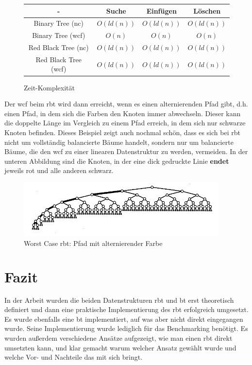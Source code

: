 \documentclass[11pt]{article}
\begin{document}
\begin{figure}[h]
  \centering  
  \caption{Zeit-Komplexität}
  \begin{tabular}{|c|c|c|c|} 
    \hline
    - & Suche & Einfügen & Löschen \\ 
    \hline
    Binary Tree (\gls{nc}) & $O(ld(n))$ & $O(ld(n))$ & $O(ld(n))$ \\ 
    \hline
    Binary Tree (\gls{wcf}) & $O(n)$ & $O(n)$ & $O(n)$ \\ 
    \hline
    Red Black Tree (\gls{nc}) & $O(ld(n))$ & $O(ld(n))$ & $O(ld(n))$ \\ 
    \hline
    Red Black Tree (\gls{wcf}) & $O(ld(n))$ & $O(ld(n))$ & $O(ld(n))$ \\ 
    \hline
  \end{tabular}
\end{figure}

Der \gls{wcf} beim \gls{rbt} wird dann erreicht, wenn es einen alternierenden Pfad gibt, d.h. einen Pfad, in dem sich die Farben den Knoten immer abwechseln.
Dieser kann die doppelte Länge im Vergleich zu einem Pfad erreich, in dem sich nur schwarze Knoten befinden.
Dieses Beispiel zeigt auch nochmal schön, dass es sich bei \gls{rbt} nicht um vollständig balancierte Bäume handelt, sondern nur um balancierte Bäume, die den \gls{wcf} zu einer linearen Datenstruktur zu werden, vermeiden.
In der unteren Abbildung sind die Knoten, in der eine dick gedruckte Linie \textbf{endet} jeweils rot und alle anderen schwarz.  

\begin{figure}[h]
  \centering
  \includegraphics[width=400px]{worst_case.png}
  \caption{Worst Case \gls{rbt}: Pfad mit alternierender Farbe}
\end{figure}
\cite[S. 228]{aic}

\pagebreak
\section{Fazit}

In der Arbeit wurden die beiden Datenstrukturen \gls{rbt} und \gls{bt} erst theoretisch definiert 
und dann eine praktische Implementierung des \gls{rbt} erfolgreich umgesetzt. Es wurde ebenfalls eine \gls{bt} implementiert, 
auf was aber nicht direkt eingegangen wurde. Seine Implementierung wurde lediglich für das Benchmarking benötigt.
Es wurden außerdem verschiedene Ansätze aufgezeigt, wie man einen \gls{rbt} direkt umsetzten kann, und klar gemacht warum welcher Ansatz gewählt wurde und welche Vor- und Nachteile das mit sich bringt.
\end{document}
